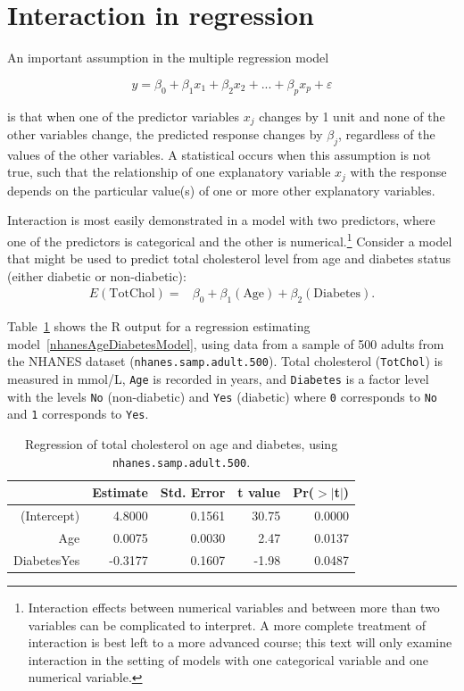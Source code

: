 \section{Interaction in regression}
\label{interactionRegression}

An important assumption in the multiple regression model

\[y = \beta_0 + \beta_1x_1 + \beta_2x_2 + ... + \beta_px_p + \varepsilon \] 

is that when one of the predictor variables $x_j$ changes by 1 unit and none of the other variables change, the predicted response changes by $\beta_j$, regardless of the values of the other variables.  A statistical  occurs when this assumption is not true, such that the relationship of one explanatory variable $x_j$ with the response depends on the particular value(s) of one or more other explanatory variables.

Interaction is most easily demonstrated in a model with two predictors, where one of the predictors is categorical and the other is numerical.\footnote{Interaction effects between numerical variables and between more than two variables can be complicated to interpret. A more complete treatment of interaction is best left to a more advanced course; this text will only examine interaction in the setting of models with one categorical variable and one numerical variable.} Consider a model that might be used to predict total cholesterol level from age and diabetes status (either diabetic or non-diabetic):
\begin{align}
E(\text{TotChol}) =& \beta_0 + \beta_1(\text{Age}) + \beta_2(\text{Diabetes}).
\label{nhanesAgeDiabetesModel}
\end{align}

Table~\ref{nhanesAgeDiabetes} shows the \textsf{R} output for a regression estimating model~\ref{nhanesAgeDiabetesModel}, using data from a sample of 500 adults from the NHANES dataset (\texttt{nhanes.samp.adult.500}). Total cholesterol (\texttt{TotChol}) is measured in mmol/L, \texttt{Age} is recorded in years, and \texttt{Diabetes} is a factor level with the levels \texttt{No} (non-diabetic) and \texttt{Yes} (diabetic) where \texttt{0} corresponds to \texttt{No} and \texttt{1} corresponds to \texttt{Yes}.

\begin{table}[ht]
	\centering
	\begin{tabular}{rrrrr}
		\hline
		& Estimate & Std. Error & t value & Pr($>$$|$t$|$) \\ 
		\hline
		(Intercept) & 4.8000 & 0.1561 & 30.75 & 0.0000 \\ 
		Age & 0.0075 & 0.0030 & 2.47 & 0.0137 \\ 
		DiabetesYes & -0.3177 & 0.1607 & -1.98 & 0.0487 \\ 
		\hline
	\end{tabular}
	\caption{Regression of total cholesterol on age and diabetes, 
		using \texttt{nhanes.samp.adult.500}.} 
	\label{nhanesAgeDiabetes}
\end{table}

